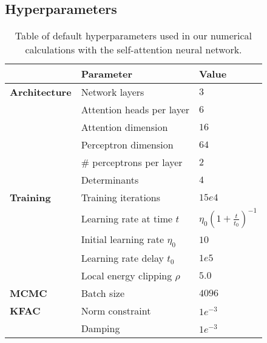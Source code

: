 \documentclass[
 reprint,
 amsmath,amssymb,
 aps, prx,
floatfix,longbibliography,
]{revtex4-2}
\begin{document}
\begin{appendix}
\section{Hyperparameters}
\label{app:Hyperparameters} 

\begin{table}
    \centering
    \renewcommand{\arraystretch}{1.3}
    \begin{tabular}{ll l}
        \toprule
        & \textbf{Parameter} & \textbf{Value} \\
        \midrule
        \textbf{Architecture} & Network layers & $3$ \\
        & Attention heads per layer & $6$ \\
        & Attention dimension & $16$ \\
        & Perceptron dimension & $64$ \\
        & $\#$ perceptrons per layer & $2$ \\
        & Determinants & $4$\\
        \midrule
        \textbf{Training} & Training iterations & $15e4$ \\
        & Learning rate at time $t$ & $\eta_0(1 + \frac{t}{t_0})^{-1}$ \\
        & Initial learning rate $\eta_0$ & $10$ \\
        & Learning rate delay $t_0$ & $1e5$ \\
        & Local energy clipping $\rho$ & $5.0$ \\
        \midrule
        \textbf{MCMC} & Batch size & $4096$ \\
        \midrule
        \textbf{KFAC} & Norm constraint & $1e^{-3}$ \\
        & Damping & $1e^{-3}$ \\
        \bottomrule
    \end{tabular}
    \caption{Table of default hyperparameters used in our numerical calculations with the self-attention neural network.}
    \label{Tab:Hyperparams}
\end{table}


\end{appendix}
\end{document}
